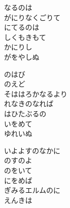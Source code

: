 \documentclass[10pt,b5j]{tarticle} %
\begin{document}
\vspace{1.5em} %
\newcommand{\linespace}{0.5em} %
\newcommand{\blocksize}{0.5\hsize} %
\begin{enumerate} %
    \begin{minipage}[c]{\blocksize}
    
        \vspace{\linespace}
        \item
        なるのは\\
        がにりなくごりて\\
        にてるのは\\
        しくもきもて\\
        かにりし\\
        がをやしぬ
        
        \vspace{\linespace}
        \item
        のはび\\
        のえど\\
        そははろかなるより\\
        れなきのなれば\\
        はひたぶるの\\
        いをめて\\
        ゆれいぬ
        
        \vspace{\linespace}
        \item
        いよよすのなかに\\
        のすのよ\\
        のをいて\\
        にをめば\\
        ぎみるエルムのに\\
        えんきは
        

\end{minipage}
\end{enumerate}
\end{document}
